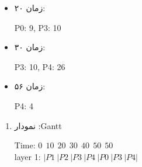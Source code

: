 \begin{qsolve}
\begin{enumerate}
\begin{itemize}
			\item زمان ۲۰: \\
			\begin{latin}
				P0: 9, P3: 10
			\end{latin}
			
			\item زمان ۳۰: \\
			\begin{latin}
				P3: 10, P4: 26	
			\end{latin}
			
			\item زمان ۵۶: \\
			\begin{latin}
				P4: 4
			\end{latin}
		\end{itemize}
	\end{enumerate}
\end{qsolve}

\begin{qsolve}
	\begin{enumerate}
		\item نمودار :Gantt \\
		\begin{latin}
			Time: $ 0 \ \ 10 \ \ 20 \ \ 30 \ \ 40 \ \ 50 \ \ 50 $ \\
			layer 1: $ | P1 \ | P2 \ | P3 \ | P4 \ | P0 \ | P3 \ | P4 | $	
		\end{latin}
	\end{enumerate}
\end{qsolve}